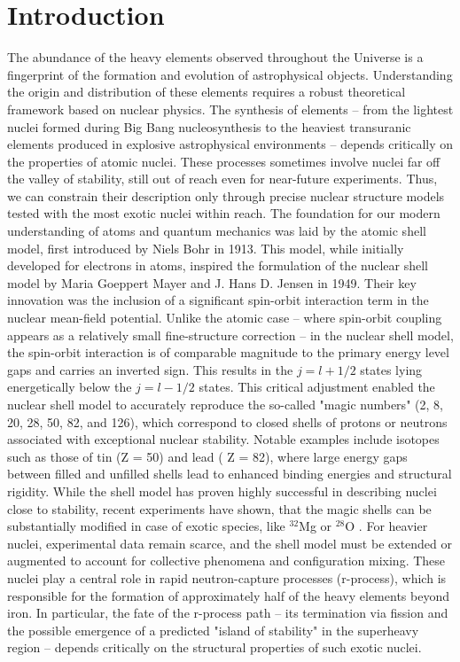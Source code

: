 \section{Introduction}
The abundance of the heavy elements observed throughout the Universe is a fingerprint of the formation and evolution of astrophysical objects. Understanding the origin and distribution of these elements requires a robust theoretical framework based on nuclear physics. The synthesis of elements -- from the lightest nuclei formed during Big Bang nucleosynthesis to the heaviest transuranic elements produced in explosive astrophysical environments -- depends critically on the properties of atomic nuclei. These processes sometimes involve nuclei far off the valley of stability, still out of reach even for near-future experiments. Thus, we can constrain their description only through precise nuclear structure models tested with the most exotic nuclei within reach.\newline
The foundation for our modern understanding of atoms and quantum mechanics was laid by the atomic shell model, first introduced by Niels Bohr in 1913. This model, while initially developed for electrons in atoms, inspired the formulation of the nuclear shell model by Maria Goeppert Mayer and J. Hans D. Jensen in 1949. Their key innovation was the inclusion of a significant spin-orbit interaction term in the nuclear mean-field potential. Unlike the atomic case -- where spin-orbit coupling appears as a relatively small fine-structure correction -- in the nuclear shell model, the spin-orbit interaction is of comparable magnitude to the primary energy level gaps and carries an inverted sign. This results in the $j = l + 1/2$ states lying energetically below the $j = l - 1/2$  states.\newline
This critical adjustment enabled the nuclear shell model to accurately reproduce the so-called "magic numbers" (2, 8, 20, 28, 50, 82, and 126), which correspond to closed shells of protons or neutrons associated with exceptional nuclear stability. Notable examples include isotopes such as those of tin (Z = 50) and  lead ( Z = 82), where large energy gaps between filled and unfilled shells lead to enhanced binding energies and structural rigidity.\newline
While the shell model has proven highly successful in describing nuclei close to stability, recent experiments have shown, that the magic shells can be substantially modified in case of exotic species, like $^{32}$Mg \cite{wimmer2010discovery} or $^{28}$O \cite{kanungo2009one}. For heavier nuclei, experimental data remain scarce, and the shell model must be extended or augmented to account for collective phenomena and configuration mixing. These nuclei play a central role in rapid neutron-capture processes (r-process), which is responsible for the formation of approximately half of the heavy elements beyond iron. In particular, the fate of the r-process path -- its termination via fission and the possible emergence of a predicted "island of stability" in the superheavy region -- depends critically on the structural properties of such exotic nuclei.\newline
